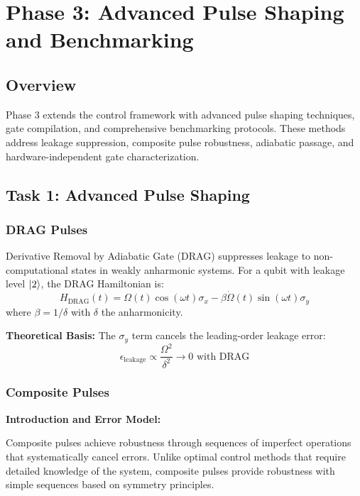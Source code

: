 \documentclass[11pt,a4paper]{article}
\theoremstyle{definition}
\theoremstyle{remark}
\begin{document}
\section{Phase 3: Advanced Pulse Shaping and Benchmarking}
\label{sec:phase3}

\subsection{Overview}

Phase 3 extends the control framework with advanced pulse shaping techniques, gate compilation, and comprehensive benchmarking protocols. These methods address leakage suppression, composite pulse robustness, adiabatic passage, and hardware-independent gate characterization.

\subsection{Task 1: Advanced Pulse Shaping}

\subsubsection{DRAG Pulses}

Derivative Removal by Adiabatic Gate (DRAG) suppresses leakage to non-computational states in weakly anharmonic systems. For a qubit with leakage level $\ket{2}$, the DRAG Hamiltonian is:
\begin{equation}
H_{\text{DRAG}}(t) = \Omega(t)\cos(\omega t)\sigma_x - \beta\dot{\Omega}(t)\sin(\omega t)\sigma_y
\end{equation}
where $\beta = 1/\delta$ with $\delta$ the anharmonicity.

\textbf{Theoretical Basis:} The $\sigma_y$ term cancels the leading-order leakage error:
\begin{equation}
\epsilon_{\text{leakage}} \propto \frac{\Omega^2}{\delta^2} \rightarrow 0 \text{ with DRAG}
\end{equation}

\subsubsection{Composite Pulses}

\textbf{Introduction and Error Model:}

Composite pulses achieve robustness through sequences of imperfect operations that systematically cancel errors. Unlike optimal control methods that require detailed knowledge of the system, composite pulses provide robustness with simple sequences based on symmetry principles.
\end{document}
